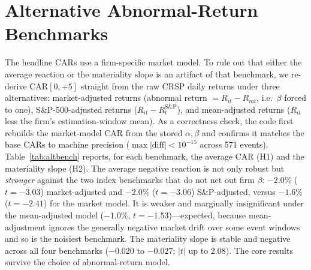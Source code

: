 \documentclass[12pt]{article}
\begin{document}
\section{Alternative Abnormal-Return Benchmarks}\label{sec:altbench}
The headline CARs use a firm-specific market model. To rule out that either the
average reaction or the materiality slope is an artifact of that benchmark, we
re-derive CAR$[0,+5]$ straight from the raw CRSP daily returns under three
alternatives: market-adjusted returns (abnormal return $=R_{it}-R_{mt}$, i.e.\
$\beta$ forced to one), S\&P-500-adjusted returns ($R_{it}-R^{\text{S\&P}}_{t}$),
and mean-adjusted returns ($R_{it}$ less the firm's estimation-window mean). As a
correctness check, the code first rebuilds the market-model CAR from the stored
$\alpha,\beta$ and confirms it matches the base CARs to machine precision
($\max|\text{diff}|<10^{-15}$ across 571 events). Table~\ref{tab:altbench} reports,
for each benchmark, the average CAR (H1) and the materiality slope (H2). The
average negative reaction is not only robust but \emph{stronger} against the two
index benchmarks that do not net out firm $\beta$: $-2.0\%$ ($t=-3.03$)
market-adjusted and $-2.0\%$ ($t=-3.06$) S\&P-adjusted, versus $-1.6\%$
($t=-2.41$) for the market model. It is weaker and marginally insignificant under
the mean-adjusted model ($-1.0\%$, $t=-1.53$)---expected, because mean-adjustment
ignores the generally negative market drift over some event windows and so is the
noisiest benchmark. The materiality slope is stable and negative across all four
benchmarks ($-0.020$ to $-0.027$; $|t|$ up to $2.08$). The core results survive
the choice of abnormal-return model.
\end{document}
